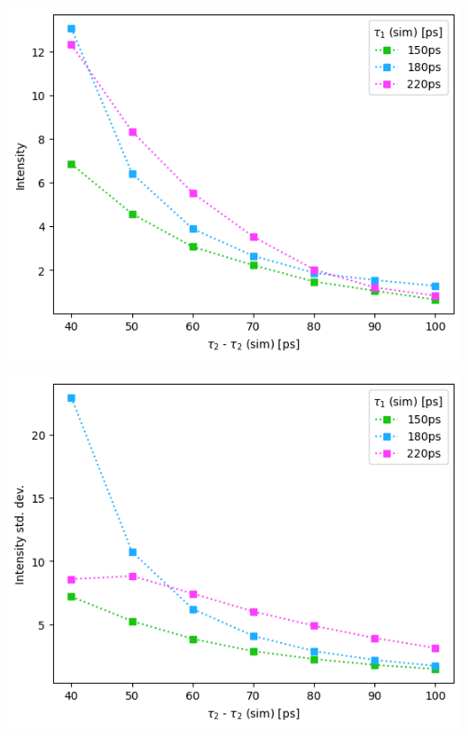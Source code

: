 \begin{minipage}{.5\linewidth}
    \centering
    \includegraphics[width=\linewidth]{Batch 3/regular IRF/2080-diff i1.png}
    \label{fig:comp-I-2080}
\end{minipage}
\begin{minipage}{.5\linewidth}
    \centering
    \includegraphics[width=\linewidth]{Batch 3/regular IRF/2080-err i1.png}
    \label{fig:comp-Ierr-2080}
\end{minipage}
